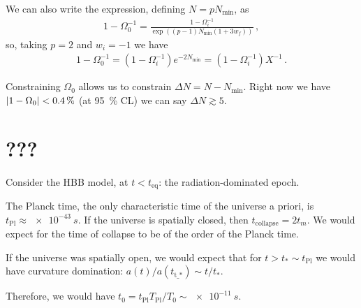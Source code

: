 \documentclass[main.tex]{subfiles}
\begin{document}
We can also write the expression, defining \(N = p N _{\text{min}}\), as
%
\begin{align}
1 - \Omega_0^{-1} = \frac{1 - \Omega_i^{-1}}{\exp((p -1) N _{\text{min}} (1 + 3 w_f))}
\,,
\end{align}
%
so, taking \(p = 2\) and \(w_i = -1\) we have 
%
\begin{align}
1 - \Omega_0^{-1} = (1 - \Omega _i^{-1} ) e^{-2 N _{\text{min}}} = (1-\Omega _i^{-1}) X^{-1}
\,.
\end{align}

Constraining \(\Omega_0\) allows us to constrain \(\Delta N = N - N _{\text{min}}\). 
Right now we have \(\abs{1 - \Omega_0 } < \SI{.4}{\percent}\) (at \SI{95}{\percent} CL) we can say \(\Delta N \gtrsim 5\).

\section{???}

Consider the HBB model, at \(t < t _{\text{eq}}\): the radiation-dominated epoch. 

The Planck time, the only characteristic time of the universe a priori, is \(t _{\text{Pl}} \approx \SI{e-43}{s}\). 
If the universe is spatially closed, then \(t _{\text{collapse}} = 2 t_m\). 
We would expect for the time of collapse to be of the order of the Planck time. 

If the universe was spatially open, we would expect that for \(t > t_* \sim t _{\text{Pl}}\) we would have curvature domination: \(a (t)/ a(t _{\text{t_*}}) \sim t / t_*\).

Therefore, we would have \(t_0 = t _{\text{Pl}} T _{\text{Pl}} / T_0 \sim \SI{e-11}{s}\). 
\end{document}

